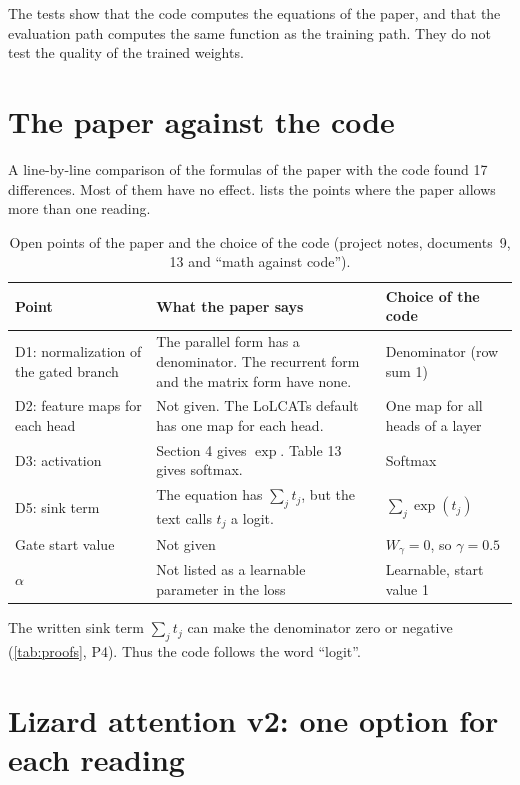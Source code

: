 \begin{finding}
The tests show that the code computes the equations of the paper, and that the evaluation path computes the same function as the training path. They do not test the quality of the trained weights.
\end{finding}

\section{The paper against the code}
\label{sec:paper-vs-code}

A line-by-line comparison of the formulas of the paper with the code found 17 differences. Most of them have no effect.  lists the points where the paper allows more than one reading.

\begin{table}[ht]
\centering
\small
\caption[Open points of the paper]{Open points of the paper and the choice of the code (project notes, documents~9, 13 and \enquote{math against code}).}
\label{tab:open-points}
\begin{tabularx}{\linewidth}{@{}>{\raggedright\arraybackslash}p{3.3cm}LL@{}}
\toprule
Point & What the paper says & Choice of the code \\
\midrule
D1: normalization of the gated branch & The parallel form has a denominator. The recurrent form and the matrix form have none. & Denominator (row sum 1) \\
D2: feature maps for each head & Not given. The LoLCATs default has one map for each head. & One map for all heads of a layer \\
D3: activation & Section 4 gives $\exp$. Table 13 gives softmax. & Softmax \\
D5: sink term & The equation has $\sum_j t_j$, but the text calls $t_j$ a logit. & $\sum_j \exp(t_j)$ \\
Gate start value & Not given & $W_\gamma = 0$, so $\gamma = 0.5$ \\
$\alpha$ & Not listed as a learnable parameter in the loss & Learnable, start value 1 \\
\bottomrule
\end{tabularx}
\end{table}

The written sink term $\sum_j t_j$ can make the denominator zero or negative (\cref{tab:proofs}, P4). Thus the code follows the word \enquote{logit}.

\section{Lizard attention v2: one option for each reading}
\label{sec:v2}

